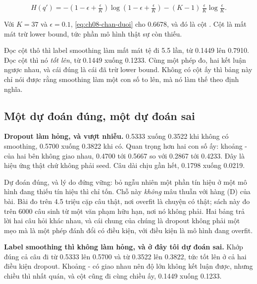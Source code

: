 \begin{equation}
  H(q') = -\left(1 - \epsilon + \tfrac{\epsilon}{K}\right)
            \log\!\left(1 - \epsilon + \tfrac{\epsilon}{K}\right)
          - (K-1)\,\tfrac{\epsilon}{K} \log \tfrac{\epsilon}{K}.
  \label{eq:ch08-chan-duoi}
\end{equation}

Với \(K = 37\) và \(\epsilon = 0.1\), \eqref{eq:ch08-chan-duoi} cho 0.6678, và
đó là cột . Cột  là mất mát trừ lower bound, tức phần
mô hình thật sự còn thiếu.

Đọc cột  thô thì label smoothing làm mất mát tệ đi 5.5 lần, từ 0.1449
lên 0.7910. Đọc cột  thì nó \emph{tốt lên}, từ 0.1449 xuống 0.1233.
Cùng một phép đo, hai kết luận ngược nhau, và cái đúng là cái đã trừ lower
bound. Không có cột ấy thì bảng này chỉ nói được rằng smoothing làm một con số
to lên, mà nó làm thế theo định nghĩa.

\subsection*{Một dự đoán đúng, một dự đoán sai}

%
\textbf{Dropout làm hỏng, và vượt nhiễu.} 0.5333 xuống 0.3522 khi không có
smoothing, 0.5700 xuống 0.3822 khi có. Quan trọng hơn hai con số ấy: khoảng
- của hai bên không giao nhau, 0.4700 tới 0.5667 so với
0.2867 tới 0.4233. Đây là hiệu ứng thật chứ không phải seed. Câu dài chịu gần
hết, 0.1798 xuống 0.0219.

Dự đoán đúng, và lý do đứng vững: bỏ ngẫu nhiên một phần tín hiệu ở một mô hình
đang thiếu tín hiệu thì chỉ tốn. Chỗ này \emph{không} mâu thuẫn với hàng (D) của
bài. Bài đo trên 4.5 triệu cặp câu thật, nơi overfit là chuyện có thật; sách này
đo trên 6000 câu sinh từ một văn phạm hữu hạn, nơi nó không phải. Hai bảng trả
lời hai câu hỏi khác nhau, và cái chung của chúng là dropout không phải một mẹo
mà là một phép đánh đổi có điều kiện, với điều kiện là mô hình đang overfit.

%
\textbf{Label smoothing thì không làm hỏng, và ở đây tôi dự đoán sai.} Khớp đúng
cả câu đi từ 0.5333 lên 0.5700 và từ 0.3522 lên 0.3822, tức tốt lên ở cả hai
điều kiện dropout. Khoảng - có giao nhau nên độ lớn không
kết luận được, nhưng chiều thì nhất quán, và cột  cũng đi cùng
chiều ấy, 0.1449 xuống 0.1233.

